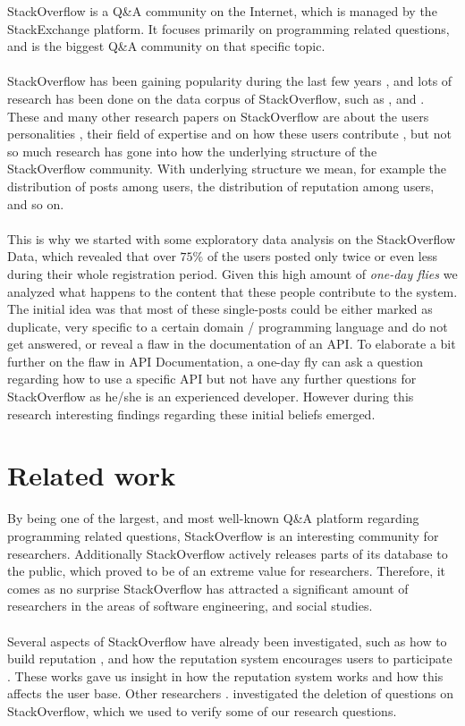 \documentclass[conference]{IEEEtran}
\begin{document}
StackOverflow is a Q\&A community on the Internet, which is managed by the StackExchange platform. It focuses primarily on programming related questions, and is the biggest Q\&A community on that specific topic.
\\
\\
StackOverflow has been gaining popularity during the last few years \cite{SOPopularity}, and lots of research has been done on the data corpus of StackOverflow, such as \cite{SOResearch1}, \cite{SOResearch2} and \cite{SOResearch3}. These and many other research papers on StackOverflow are about the users personalities \cite{buildingrep}, their field of expertise and on how these users contribute \cite{repsystem}, but not so much research has gone into how the underlying structure of the StackOverflow community. With underlying structure we mean, for example the distribution of posts among users, the distribution of reputation among users, and so on.
\\
\\
This is why we started with some exploratory data analysis on the StackOverflow Data, which revealed that over $75\%$ of the users posted only twice or even less during their whole registration period. Given this high amount of  \textit{one-day flies} we analyzed what happens to the content that these people contribute to the system. The initial idea was that most of these single-posts could be either marked as duplicate, very specific to a certain domain / programming language and do not get answered, or reveal a flaw in the documentation of an API. To elaborate a bit further on the flaw in API Documentation, a one-day fly can ask a question regarding how to use a specific API but not have any further questions for StackOverflow as he/she is an experienced developer. However during this research interesting findings regarding these initial beliefs emerged.


\section{Related work}

By being one of the largest, and most well-known Q\&A platform regarding programming related questions, StackOverflow is an interesting community for researchers. Additionally StackOverflow actively releases parts of its database to the public, which proved to be of an extreme value for researchers. Therefore, it comes as no surprise StackOverflow has attracted a significant amount of researchers in the areas of software engineering,
 and social studies.
\\
\\
Several aspects of StackOverflow have already been investigated, such as how to build reputation \cite{buildingrep}, and how the reputation system encourages users to participate \cite{repsystem}. These works gave us insight in how the reputation system works and how this affects the user base. Other researchers \cite{correa2014chaff}. investigated the deletion of questions on StackOverflow, which we used to verify some of our research questions. 
\end{document}
